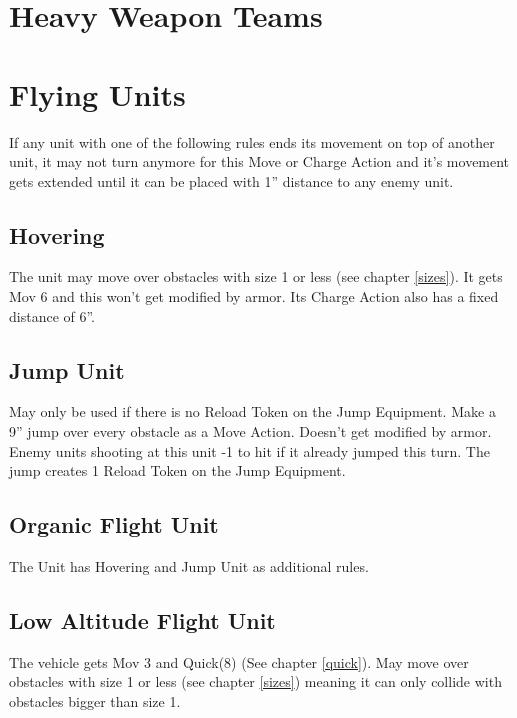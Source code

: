 \documentclass[
	11pt,
	toc=bibliography
	]{article}
\begin{document}
\newpage
\restoregeometry
\section{Heavy Weapon Teams}\label{heavyWeaponTeams}

\newpage
\section{Flying Units}\label{flyingUnits}
If any unit with one of the following rules ends its movement on top of another unit, it may not turn anymore for this Move or Charge Action and it's movement gets extended until it can be placed with 1'' distance to any enemy unit.
 
\subsection{Hovering}
The unit may move over obstacles with size 1 or less (see chapter \ref{sizes}). It gets Mov 6 and this won't get modified by armor. Its Charge Action also has a fixed distance of 6''.

\subsection{Jump Unit}\label{jumpUnit}
May only be used if there is no Reload Token on the Jump Equipment. Make a 9'' jump over every obstacle as a Move Action. Doesn't get modified by armor. Enemy units shooting at this unit -1 to hit if it already jumped this turn. The jump creates 1 Reload Token on the Jump Equipment.

\subsection{Organic Flight Unit}
The Unit has Hovering and Jump Unit as additional rules.

\subsection{Low Altitude Flight Unit}
The vehicle gets Mov 3 and Quick(8) (See chapter \ref{quick}). May move over obstacles with size 1 or less (see chapter \ref{sizes}) meaning it can only collide with obstacles bigger than size 1.
\end{document}
